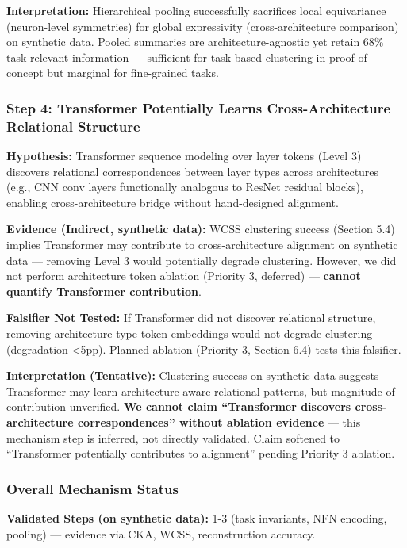 \textbf{Interpretation:} Hierarchical pooling successfully sacrifices local equivariance (neuron-level symmetries) for global expressivity (cross-architecture comparison) on synthetic data. Pooled summaries are architecture-agnostic yet retain 68\% task-relevant information --- sufficient for task-based clustering in proof-of-concept but marginal for fine-grained tasks.

\subsubsection{Step 4: Transformer Potentially Learns Cross-Architecture Relational Structure}

\textbf{Hypothesis:} Transformer sequence modeling over layer tokens (Level 3) discovers relational correspondences between layer types across architectures (e.g., CNN conv layers functionally analogous to ResNet residual blocks), enabling cross-architecture bridge without hand-designed alignment.

\textbf{Evidence (Indirect, synthetic data):} WCSS clustering success (Section 5.4) implies Transformer may contribute to cross-architecture alignment on synthetic data --- removing Level 3 would potentially degrade clustering. However, we did not perform architecture token ablation (Priority 3, deferred) --- \textbf{cannot quantify Transformer contribution}.

\textbf{Falsifier Not Tested:} If Transformer did not discover relational structure, removing architecture-type token embeddings would not degrade clustering (degradation <5pp). Planned ablation (Priority 3, Section 6.4) tests this falsifier.

\textbf{Interpretation (Tentative):} Clustering success on synthetic data suggests Transformer may learn architecture-aware relational patterns, but magnitude of contribution unverified. \textbf{We cannot claim ``Transformer discovers cross-architecture correspondences'' without ablation evidence} --- this mechanism step is inferred, not directly validated. Claim softened to ``Transformer potentially contributes to alignment'' pending Priority 3 ablation.

\subsubsection{Overall Mechanism Status}

\textbf{Validated Steps (on synthetic data):} 1-3 (task invariants, NFN encoding, pooling) --- evidence via CKA, WCSS, reconstruction accuracy.

